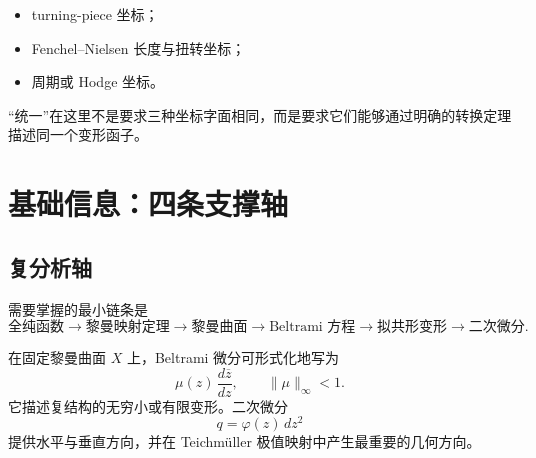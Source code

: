 \documentclass[UTF8,fontset=none,a4paper,11pt]{ctexart}
\begin{document}
\begin{itemize}
  \item turning-piece 坐标；
  \item Fenchel--Nielsen 长度与扭转坐标；
  \item 周期或 Hodge 坐标。
\end{itemize}

“统一”在这里不是要求三种坐标字面相同，而是要求它们能够通过明确的转换定理描述同一个变形函子。

\section{基础信息：四条支撑轴}

\subsection{复分析轴}

需要掌握的最小链条是
\[
\text{全纯函数}
\to \text{黎曼映射定理}
\to \text{黎曼曲面}
\to \text{Beltrami 方程}
\to \text{拟共形变形}
\to \text{二次微分}.
\]

在固定黎曼曲面 $X$ 上，Beltrami 微分可形式化地写为
\[
  \mu(z)\,\frac{d\overline z}{dz},
  \qquad \lVert\mu\rVert_\infty<1.
\]
它描述复结构的无穷小或有限变形。二次微分
\[
  q=\varphi(z)\,dz^2
\]
提供水平与垂直方向，并在 Teichmüller 极值映射中产生最重要的几何方向。
\end{document}
